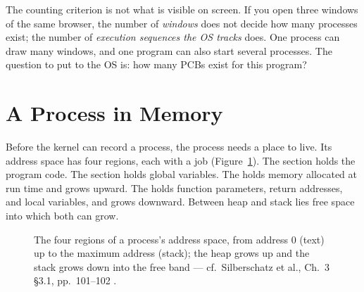 \documentclass[11pt]{article}
\begin{document}
The counting criterion is not what is visible on screen. If you open three
windows of the same browser, the number of \emph{windows} does not decide how
many processes exist; the number of \emph{execution sequences the OS tracks}
does. One process can draw many windows, and one program can also start several
processes. The question to put to the OS is: how many PCBs exist for this
program?

\section{A Process in Memory}

\noindent{}

Before the kernel can record a process, the process needs a place to live. Its
address space has four regions, each with a job (Figure~\ref{fig:layout}).
The  section holds the program code. The  section holds
global variables. The  holds memory allocated at run time and grows
upward. The  holds function parameters, return addresses, and local
variables, and grows downward. Between heap and stack lies free space into
which both can grow.

\begin{figure}[h]
\centering
{}
\caption{The four regions of a process's address space, from address 0 (text)
up to the maximum address (stack); the heap grows up and the stack grows down
into the free band --- cf.\ Silberschatz et al., Ch.~3 \S3.1, pp.~101--102
\cite{SilberschatzOSC_operating_system_concepts}.}
\label{fig:layout}
\end{figure}
\end{document}
